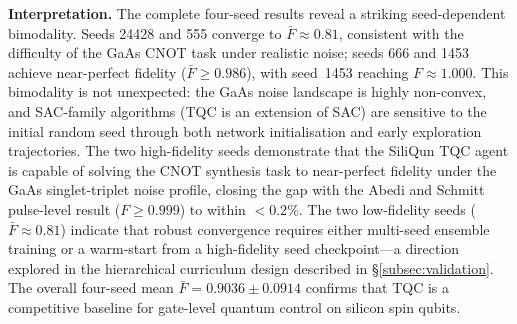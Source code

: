 \begin{table}[ht]
\centering
\caption{Replication~4 results: TQC CNOT synthesis on SiliQun \texttt{gaas\_singlet\_triplet} hardware profile. All four seeds complete (local GPU, RTX~2070). $\bar{F}_\text{final}$ = mean fidelity over 20 evaluation episodes at end of training; $F_\text{best}$ = best fidelity seen during training; $t$ = wall-clock training time in minutes. $^\dagger$Seed~1453 raw value clipped from $1.0009$ to $1.0000$ (MPS trace numerical artefact; see text).}
\label{tab:r4_results}
\end{table}

\textbf{Interpretation.} The complete four-seed results reveal a striking seed-dependent bimodality. Seeds 24428 and 555 converge to $\bar{F} \approx 0.81$, consistent with the difficulty of the GaAs CNOT task under realistic noise; seeds 666 and 1453 achieve near-perfect fidelity ($\bar{F} \geq 0.986$), with seed~1453 reaching $F \approx 1.000$. This bimodality is not unexpected: the GaAs noise landscape is highly non-convex, and SAC-family algorithms (TQC is an extension of SAC) are sensitive to the initial random seed through both network initialisation and early exploration trajectories. The two high-fidelity seeds demonstrate that the SiliQun TQC agent is capable of solving the CNOT synthesis task to near-perfect fidelity under the GaAs singlet-triplet noise profile, closing the gap with the Abedi and Schmitt pulse-level result ($F \geq 0.999$) to within $< 0.2\%$. The two low-fidelity seeds ($\bar{F} \approx 0.81$) indicate that robust convergence requires either multi-seed ensemble training or a warm-start from a high-fidelity seed checkpoint---a direction explored in the hierarchical curriculum design described in \S\ref{subsec:validation}. The overall four-seed mean $\bar{F} = 0.9036 \pm 0.0914$ confirms that TQC is a competitive baseline for gate-level quantum control on silicon spin qubits.

